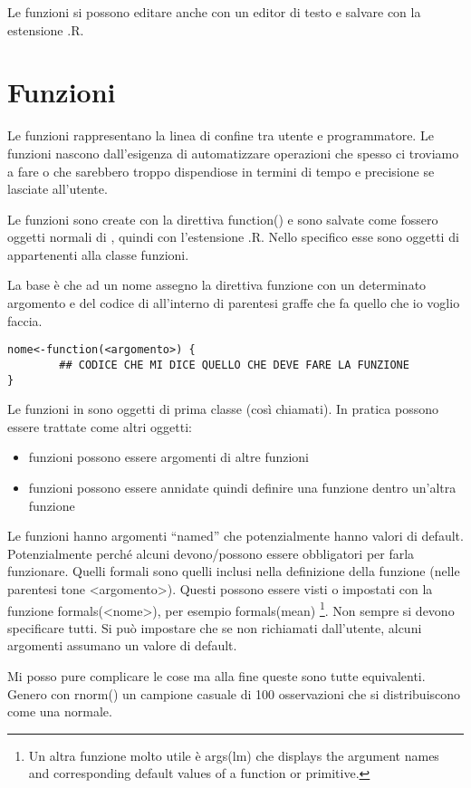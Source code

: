 Le funzioni si possono editare anche con un editor di testo e salvare con la
estensione .R.

\section{Funzioni}

Le funzioni rappresentano la linea di confine tra utente e programmatore.
Le funzioni nascono dall'esigenza di automatizzare operazioni che spesso ci troviamo a fare o che sarebbero troppo dispendiose in termini di tempo e precisione se lasciate all'utente.

Le funzioni sono create con la direttiva function() e sono salvate come fossero oggetti
normali di \erre, quindi con l'estensione .R. Nello specifico esse sono oggetti di \erre appartenenti alla classe funzioni.

La base è che ad un nome assegno la direttiva funzione con un determinato argomento e
del codice di \erre all'interno di parentesi graffe che fa quello che io voglio faccia.
\begin{lstlisting}
nome<-function(<argomento>) {
		## CODICE CHE MI DICE QUELLO CHE DEVE FARE LA FUNZIONE
}
\end{lstlisting}
Le funzioni in \erre sono oggetti di prima classe (così chiamati).
In pratica possono essere trattate come altri oggetti:
\begin{itemize}
\item funzioni possono essere argomenti di altre funzioni
\item funzioni possono essere annidate quindi definire una funzione dentro un'altra funzione
\end{itemize}
Le funzioni hanno argomenti ``named''  che potenzialmente hanno valori di default.
Potenzialmente perché alcuni devono/possono essere obbligatori per farla funzionare.
Quelli formali sono quelli inclusi nella definizione della funzione (nelle parentesi tone <argomento>).
Questi possono essere visti o impostati con la funzione formals(<nome>), per esempio formals(mean)
\footnote{Un altra funzione molto utile è args(lm) che displays the argument names and 
corresponding default values of a function or primitive.}.
Non sempre si devono specificare tutti.
Si può impostare che se non richiamati dall'utente, alcuni argomenti assumano un valore di default.

Mi posso pure complicare le cose ma alla fine queste sono tutte equivalenti.
Genero con rnorm() un campione casuale di 100 osservazioni che si
distribuiscono come una normale.

